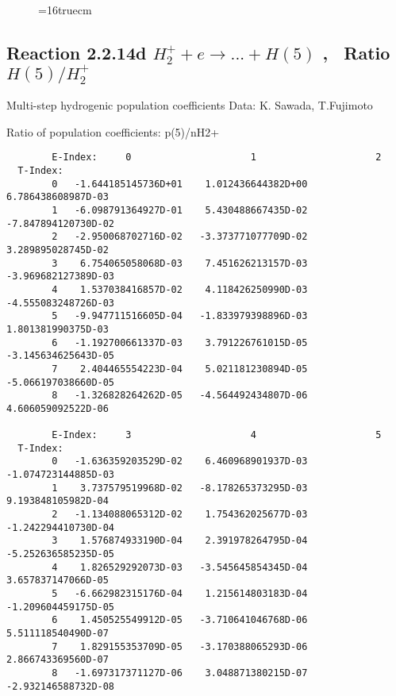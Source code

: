 \documentclass[12pt,dvipdfmx]{article}
\begin{document}
{\begin{small}
\begin{verbatim}
\end{verbatim}\end{small}
\begin{figure} \label{2.2.14c}
\epsfxsize=16truecm
\end{figure}
\newpage


\subsection{
Reaction 2.2.14d $ H_2^+ + e \rightarrow ...+ H(5) $ , \   Ratio $H(5)/H_2^+  $
}

 Multi-step hydrogenic population coefficients
 Data: K. Sawada, T.Fujimoto \cite{kn:Sawada}

 Ratio of population coefficients: p(5)/nH2+

\begin{small}\begin{verbatim}
        E-Index:     0                     1                     2
  T-Index:
        0   -1.644185145736D+01    1.012436644382D+00    6.786438608987D-03
        1   -6.098791364927D-01    5.430488667435D-02   -7.847894120730D-02
        2   -2.950068702716D-02   -3.373771077709D-02    3.289895028745D-02
        3    6.754065058068D-03    7.451626213157D-03   -3.969682127389D-03
        4    1.537038416857D-02    4.118426250990D-03   -4.555083248726D-03
        5   -9.947711516605D-04   -1.833979398896D-03    1.801381990375D-03
        6   -1.192700661337D-03    3.791226761015D-05   -3.145634625643D-05
        7    2.404465554223D-04    5.021181230894D-05   -5.066197038660D-05
        8   -1.326828264262D-05   -4.564492434807D-06    4.606059092522D-06

        E-Index:     3                     4                     5
  T-Index:
        0   -1.636359203529D-02    6.460968901937D-03   -1.074723144885D-03
        1    3.737579519968D-02   -8.178265373295D-03    9.193848105982D-04
        2   -1.134088065312D-02    1.754362025677D-03   -1.242294410730D-04
        3    1.576874933190D-04    2.391978264795D-04   -5.252636585235D-05
        4    1.826529292073D-03   -3.545645854345D-04    3.657837147066D-05
        5   -6.662982315176D-04    1.215614803183D-04   -1.209604459175D-05
        6    1.450525549912D-05   -3.710641046768D-06    5.511118540490D-07
        7    1.829155353709D-05   -3.170388065293D-06    2.866743369560D-07
        8   -1.697317371127D-06    3.048871380215D-07   -2.932146588732D-08


\end{verbatim}
\end{small}}
\end{document}
